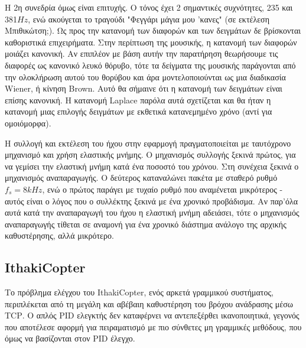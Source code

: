 \documentclass[a4paper,10pt]{article}
\begin{document}
Η 2η συνεδρία όμως είναι επιτυχής. Ο τόνος έχει 2 σημαντικές συχνότητες, 235 και 381$Hz$, ενώ ακούγεται το τραγούδι "Φεγγάρι μάγια μου 'κανες" (σε εκτέλεση Μπιθικώτση;). Ως προς την κατανομή των διαφορών και των δειγμάτων δε βρίσκονται καθοριστικά επιχειρήματα.
Στην περίπτωση της μουσικής, η κατανομή των διαφορών μοιάζει κανονική. Αν επιπλέον με βάση αυτήν την παρατήρηση θεωρήσουμε τις διαφορές ως κανονικό λευκό θόρυβο, τότε τα δείγματα της μουσικής παράγονται από την ολοκλήρωση αυτού του θορύβου και άρα μοντελοποιούνται ως μια διαδικασία \foreignlanguage{english}{Wiener}, ή κίνηση \foreignlanguage{english}{Brown}.
Αυτό θα σήμαινε ότι η κατανομή των δειγμάτων είναι επίσης κανονική. Η κατανομή Laplace παρόλα αυτά σχετίζεται και θα ήταν η κατανομή μιας επιλογής δειγμάτων με εκθετικά κατανεμημένο χρόνο (αντί για ομοιόμορφα).

Η συλλογή και εκτέλεση του ήχου στην εφαρμογή πραγματοποιείται με ταυτόχρονο μηχανισμό και χρήση ελαστικής μνήμης. Ο μηχανισμός συλλογής ξεκινά πρώτος, για να γεμίσει την ελαστική μνήμη κατά ένα ποσοστό του χρόνου. Στη συνέχεια ξεκινά ο μηχανισμός αναπαραγωγής. Ο δεύτερος καταναλώνει πακέτα με σταθερό ρυθμό $f_s= 8kHz$, ενώ ο πρώτος παράγει με τυχαίο ρυθμό που αναμένεται μικρότερος - αυτός είναι ο λόγος που ο συλλέκτης ξεκινά με ένα χρονικό προβάδισμα.
Αν παρ'όλα αυτά κατά την αναπαραγωγή του ήχου η ελαστική μνήμη αδειάσει, τότε ο μηχανισμός αναπαραγωγής τίθεται σε αναμονή για ένα χρονικό διάστημα ανάλογο της αρχικής καθυστέρησης, αλλά μικρότερο.

\subsection{\foreignlanguage{english}{IthakiCopter}}
Το πρόβλημα ελέγχου του \foreignlanguage{english}{IthakiCopter}, ενός αρκετά γραμμικού συστήματος, περιπλέκεται από τη μεγάλη και αβέβαιη καθυστέρηση του βρόχου ανάδρασης μέσω \foreignlanguage{english}{TCP}. Ο απλός \foreignlanguage{english}{PID} ελεγκτής δεν καταφέρνει να αντεπεξέρθει ικανοποιητικά, γεγονός που αποτέλεσε αφορμή για πειραματισμό με πιο σύνθετες μη γραμμικές μεθόδους, που όμως να βασίζονται στον \foreignlanguage{english}{PID} έλεγχο.
\end{document}
